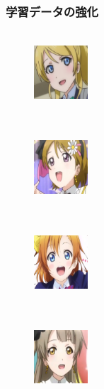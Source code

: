 \documentclass[dvipdfmx,11pt,notheorems]{beamer}
\theoremstyle{definition}
\begin{document}
\begin{frame}\frametitle{学習データの強化}
\begin{figure}[t]
 \begin{minipage}{0.2\hsize}
  \centering
   \\
  \centering
  \includegraphics[width=20mm,bb=0 0 200 200]{./fig/png/faces/eri.png} \\
  \\
 \end{minipage}
 \begin{minipage}{0.2\hsize}
  \centering
   \\
  \centering
  \includegraphics[width=20mm,bb=0 0 200 200]{./fig/png/faces/hanayo.png}\\
  \\
 \end{minipage}
 \begin{minipage}{0.2\hsize}
  \centering
   \\
  \centering
  \includegraphics[width=20mm,bb=0 0 200 200]{./fig/png/faces/honoka.png}\\
  \\
 \end{minipage}
 \begin{minipage}{0.2\hsize}
  \centering
   \\
  \centering
  \includegraphics[width=20mm,bb=0 0 200 200]{./fig/png/faces/kotori.png}\\

\end{minipage}
\end{figure}
\end{frame}
\end{document}
